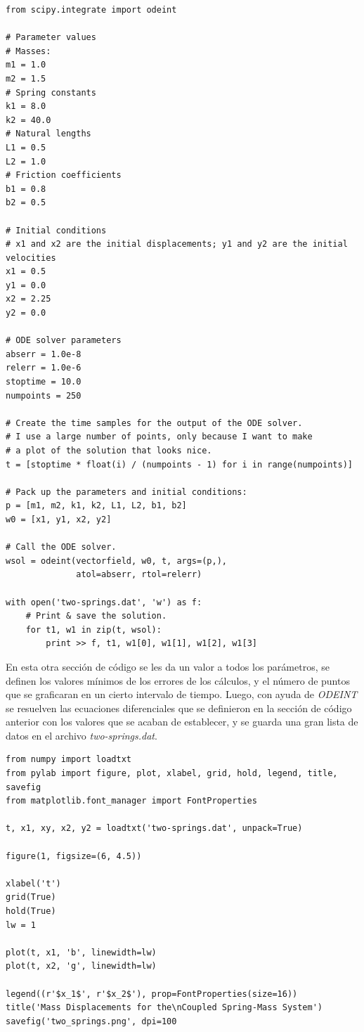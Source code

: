 \documentclass{article}
\begin{document}
\begin{verbatim}
from scipy.integrate import odeint

# Parameter values
# Masses:
m1 = 1.0
m2 = 1.5
# Spring constants
k1 = 8.0
k2 = 40.0
# Natural lengths
L1 = 0.5
L2 = 1.0
# Friction coefficients
b1 = 0.8
b2 = 0.5

# Initial conditions
# x1 and x2 are the initial displacements; y1 and y2 are the initial velocities
x1 = 0.5
y1 = 0.0
x2 = 2.25
y2 = 0.0

# ODE solver parameters
abserr = 1.0e-8
relerr = 1.0e-6
stoptime = 10.0
numpoints = 250

# Create the time samples for the output of the ODE solver.
# I use a large number of points, only because I want to make
# a plot of the solution that looks nice.
t = [stoptime * float(i) / (numpoints - 1) for i in range(numpoints)]

# Pack up the parameters and initial conditions:
p = [m1, m2, k1, k2, L1, L2, b1, b2]
w0 = [x1, y1, x2, y2]

# Call the ODE solver.
wsol = odeint(vectorfield, w0, t, args=(p,),
              atol=abserr, rtol=relerr)

with open('two-springs.dat', 'w') as f:
    # Print & save the solution.
    for t1, w1 in zip(t, wsol):
        print >> f, t1, w1[0], w1[1], w1[2], w1[3]
\end{verbatim}

En esta otra sección de código se  les da un valor a todos los parámetros, se definen los valores mínimos de los errores de los cálculos, y el número de puntos que se graficaran en un cierto intervalo de tiempo. Luego, con ayuda de \textit{ODEINT} se resuelven las ecuaciones diferenciales que se definieron en la sección de código anterior con los valores que se acaban de establecer, y se guarda una gran lista de datos en el archivo \textit{two-springs.dat}.

\vspace{0.6cm}

\begin{verbatim}
from numpy import loadtxt
from pylab import figure, plot, xlabel, grid, hold, legend, title, savefig
from matplotlib.font_manager import FontProperties

t, x1, xy, x2, y2 = loadtxt('two-springs.dat', unpack=True)

figure(1, figsize=(6, 4.5))

xlabel('t')
grid(True)
hold(True)
lw = 1

plot(t, x1, 'b', linewidth=lw)
plot(t, x2, 'g', linewidth=lw)

legend((r'$x_1$', r'$x_2$'), prop=FontProperties(size=16))
title('Mass Displacements for the\nCoupled Spring-Mass System')
savefig('two_springs.png', dpi=100
\end{verbatim}
\end{document}
